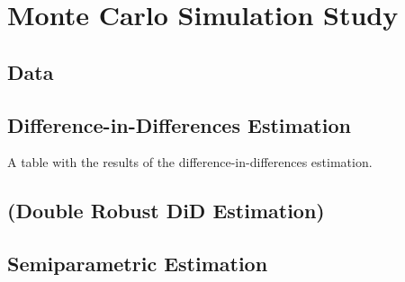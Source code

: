 \section{Monte Carlo Simulation Study}
\subsection{Data}

\subsection{Difference-in-Differences Estimation}









\begin{table}[H]
\centering
\caption{A table with the results of the difference-in-differences estimation.}
\resizebox{\textwidth}{!}{%
    
}
\label{tab:year_table}
\end{table}

\subsection{(Double Robust DiD Estimation)}
\subsection{Semiparametric Estimation} %
